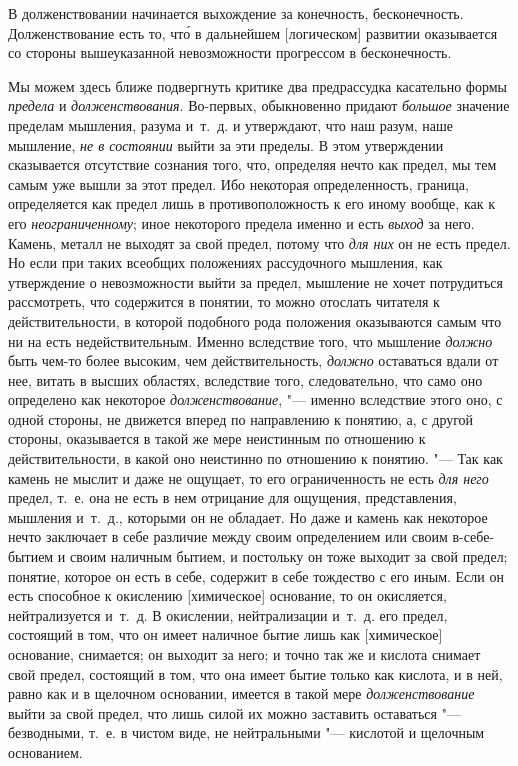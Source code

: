 В долженствовании начинается выхождение за конечность, бесконечность.
Долженствование есть то, чт\'{о} в дальнейшем [логическом] развитии оказывается
со стороны вышеуказанной невозможности прогрессом в бесконечность.

Мы можем здесь ближе подвергнуть критике два предрассудка касательно формы
{\em предела} и {\em долженствования}. Во-первых, обыкновенно придают
{\em большое} значение пределам мышления, разума
и~т.~д. и утверждают, что наш разум, наше мышление,
{\em не в состоянии} выйти за эти пределы. В этом
утверждении сказывается отсутствие сознания того, что, определяя нечто как предел,
мы тем самым уже вышли за этот предел. Ибо некоторая определенность, граница,
определяется как предел лишь в противоположность к его иному вообще, как
к его {\em неограниченному}; иное некоторого предела
именно и есть {\em выход} за него. Камень, металл не
выходят за свой предел, потому что {\em для них} он не
есть предел. Но если при таких всеобщих положениях рассудочного мышления,
как утверждение о невозможности выйти за предел, мышление не хочет
потрудиться рассмотреть, что содержится в понятии, то можно отослать
читателя к действительности, в которой подобного рода положения оказываются
самым что ни на есть недействительным. Именно вследствие того, что мышление
{\em должно} быть чем-то более высоким, чем
действительность, {\em должно} оставаться вдали от нее,
витать в высших областях, вследствие того, следовательно, что само оно
определено как некоторое {\em долженствование}, "---
именно вследствие этого оно, с одной стороны, не движется вперед по
направлению к понятию, а, с другой стороны, оказывается в такой же мере
неистинным по отношению к действительности, в какой оно неистинно по
отношению к понятию. "--- Так как камень не мыслит и даже не ощущает, то его
ограниченность не есть {\em для него} предел, т.~е. она
не есть в нем отрицание для ощущения, представления, мышления и~т.~д.,
которыми он не обладает. Но даже и камень как некоторое нечто заключает в
себе различие между своим определением или своим в-себе-бытием и своим
наличным бытием, и постольку он тоже выходит за свой предел; понятие,
которое он есть в себе, содержит в себе тождество с его иным. Если он
есть способное к окислению [химическое] основание, то он окисляется,
нейтрализуется и~т.~д. В окислении, нейтрализации и~т.~д. его предел,
состоящий в том, что он имеет наличное бытие лишь как [химическое]
основание, снимается; он выходит за него; и точно так же и кислота снимает
свой предел, состоящий в том, что она имеет бытие только как кислота, и в
ней, равно как и в щелочном основании, имеется в такой мере
{\em долженствование} выйти за свой предел, что лишь
силой их можно заставить оставаться "--- безводными, т.~е. в чистом виде, не
нейтральными "--- кислотой и щелочным основанием.

